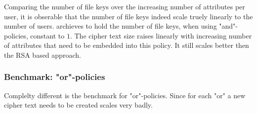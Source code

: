 Comparing the number of file keys over the increasing number of attributes per user, it is obserable that the number of file keys indeed scale truely linearly to the number of users. \name archieves to hold the number of file keys, when using "and"-policies, constant to $1$. The cipher text size raises linearly with increasing number of attributes that need to be embedded into this policy. It still scales better then the RSA based approach. 

\subsubsection{Benchmark: "or"-policies}
Complelty different is the benchmark for "or"-policies. Since for each "or" a new cipher text needs to be created \name scales very badly.

